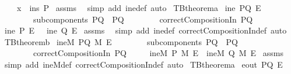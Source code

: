 \begin{isabellebody}
\ \ \ \ {\isachardoublequoteopen}x\ {\isasymnotin}\ ins\ P{\isachardoublequoteclose}\isanewline
%
\isadelimproof
%
\endisadelimproof
%
\isatagproof
{}\isamarkupfalse%
\ assms\ \isamarkupfalse%
\ {\isacharparenleft}simp\ add{\isacharcolon}\ ine{\isacharunderscore}def{\isacharcomma}\ auto{\isacharparenright}%
\endisatagproof
{\isafoldproof}%
%
\isadelimproof
\isanewline
%
\endisadelimproof
\isanewline
{}\isamarkupfalse%
\ TBtheorem{}a{\isacharcolon}\isanewline
{}\ {\isachardoublequoteopen}ine\ PQ\ E{\isachardoublequoteclose}\ \isanewline
\ \ \ \ \ \ \ \ {\isachardoublequoteopen}subcomponents\ PQ\ {\isacharequal}\ {\isacharbraceleft}P{\isacharcomma}Q{\isacharbraceright}{\isachardoublequoteclose}\isanewline
\ \ \ \ \ \ \ \ {\isachardoublequoteopen}correctCompositionIn\ PQ{\isachardoublequoteclose}\isanewline
{}\ {\isachardoublequoteopen}ine\ P\ E\ \ {\isasymor}\ ine\ Q\ E{\isachardoublequoteclose}\isanewline
%
\isadelimproof
%
\endisadelimproof
%
\isatagproof
{}\isamarkupfalse%
\ assms\ \isamarkupfalse%
\ {\isacharparenleft}simp\ add{\isacharcolon}\ ine{\isacharunderscore}def\ correctCompositionIn{\isacharunderscore}def{\isacharcomma}\ auto{\isacharparenright}%
\endisatagproof
{\isafoldproof}%
%
\isadelimproof
\isanewline
%
\endisadelimproof
\isanewline
{}\isamarkupfalse%
\ TBtheorem{}b{\isacharcolon}\isanewline
{}\ {\isachardoublequoteopen}ineM\ PQ\ M\ E{\isachardoublequoteclose}\isanewline
\ \ \ \ \ \ \ \ {\isachardoublequoteopen}subcomponents\ PQ\ {\isacharequal}\ {\isacharbraceleft}P{\isacharcomma}Q{\isacharbraceright}{\isachardoublequoteclose}\isanewline
\ \ \ \ \ \ \ \ {\isachardoublequoteopen}correctCompositionIn\ PQ{\isachardoublequoteclose}\ \isanewline
{}\ \ \ \ {\isachardoublequoteopen}ineM\ P\ M\ E\ {\isasymor}\ ineM\ Q\ M\ E{\isachardoublequoteclose}\isanewline
%
\isadelimproof
%
\endisadelimproof
%
\isatagproof
{}\isamarkupfalse%
\ assms\ \isamarkupfalse%
\ {\isacharparenleft}simp\ add{\isacharcolon}\ ineM{\isacharunderscore}def\ correctCompositionIn{\isacharunderscore}def{\isacharcomma}\ auto{\isacharparenright}%
\endisatagproof
{\isafoldproof}%
%
\isadelimproof
\isanewline
%
\endisadelimproof
\isanewline
{}\isamarkupfalse%
\ TBtheorem{}a{\isacharcolon}\isanewline
{}\ {\isachardoublequoteopen}eout\ PQ\ E{\isachardoublequoteclose}\isanewline

\end{isabellebody}
